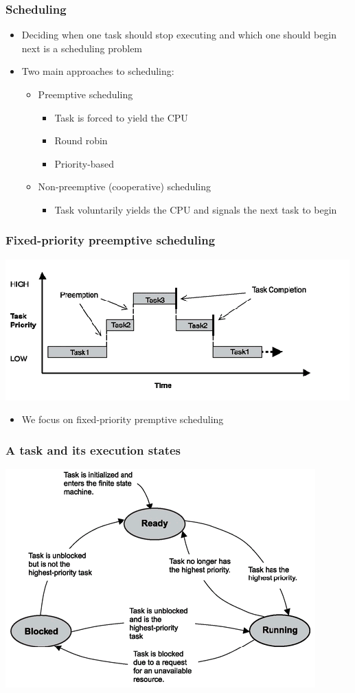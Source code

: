 \documentclass[hyperref={pdfpagelabels=false},svgnames]{beamer}
\begin{document}
\begin{frame}
\frametitle{Scheduling}
\begin{itemize}
\item Deciding when one task should stop executing and
which one should begin next is a \alert{scheduling} problem
\item Two main approaches to scheduling:
\begin{itemize}
\item Preemptive scheduling
\begin{itemize}
\item Task is \alert{forced to yield} the CPU
\item Round robin
\item Priority-based
\end{itemize}
\item Non-preemptive (cooperative) scheduling
\begin{itemize}
\item Task \alert{voluntarily yields} the CPU and signals
the next task to begin
\end{itemize}
\end{itemize}
\end{itemize}
\end{frame}


\begin{frame}
\frametitle{Fixed-priority preemptive scheduling}
\includegraphics[width=.9\textwidth]{fig5}
\begin{itemize}
\item We focus on fixed-priority premptive scheduling
\end{itemize}
\end{frame}

\begin{frame}
\frametitle{A task and its execution states}
\includegraphics[width=.9\textwidth]{fig3}
\end{frame}
\end{document}
